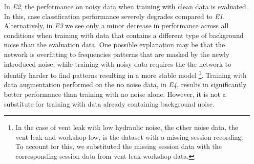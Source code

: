 In \textit{E2}, the performance on noisy data when training with clean data is evaluated. In this, case classification performance severely degrades compared to \textit{E1}. Alternatively, in \textit{E3} we see only a minor decrease in performance across all conditions when training with data that contains a different type of background noise than the evaluation data. One possible explanation may be that the network is overfitting to frequencies patterns that are masked by the newly introduced noise, while training with noisy data requires the the network to identify harder to find patterns resulting in a more stable model \footnote{In the case of vent leak with low hydraulic noise, the other noise data, the vent leak and workshop low, is the dataset with a missing session recording. To account for this, we substituted the missing session data with the corresponding session data from vent leak workshop data.}. Training with data augmentation performed on the no noise data, in \textit{E4}, results in significantly better performance than training with no noise alone. However, it is not a substitute for training with data already containing background noise. 

